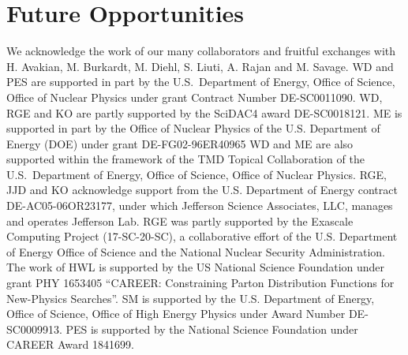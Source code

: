 \section{Future Opportunities}
\label{sec:future}



\begin{acknowledgement}
We acknowledge the work of our many collaborators and  fruitful exchanges with H. Avakian, M. Burkardt,
M. Diehl, S. Liuti, A. Rajan and M. Savage.
WD and PES are supported in part by the U.S.~Department of Energy,
Office of Science, Office of Nuclear Physics under grant Contract
Number DE-SC0011090. WD, RGE and KO are partly supported by the SciDAC4 award DE-SC0018121.
ME is supported in part by the Office of Nuclear Physics of the
U.S. Department of Energy (DOE) under grant DE-FG02-96ER40965
WD and ME  are also supported within the framework of the TMD Topical Collaboration of the U.S.~Department of Energy, Office of Science, Office of Nuclear Physics. 
RGE, JJD and KO acknowledge support from the U.S. Department of Energy
contract DE-AC05-06OR23177, under which Jefferson Science Associates,
LLC, manages and operates Jefferson Lab.
RGE was partly supported by the Exascale Computing Project (17-SC-20-SC), a collaborative effort of the U.S. Department of Energy Office of Science and the National Nuclear Security Administration.
The work of HWL  is supported by the US National Science Foundation under grant PHY 1653405 “CAREER: Constraining Parton Distribution Functions for New-Physics Searches”.
SM is supported by the U.S. Department of Energy, Office of Science, Office of High Energy Physics under Award Number DE-SC0009913.
PES is supported by the National Science Foundation under CAREER Award 1841699.  
\end{acknowledgement}






